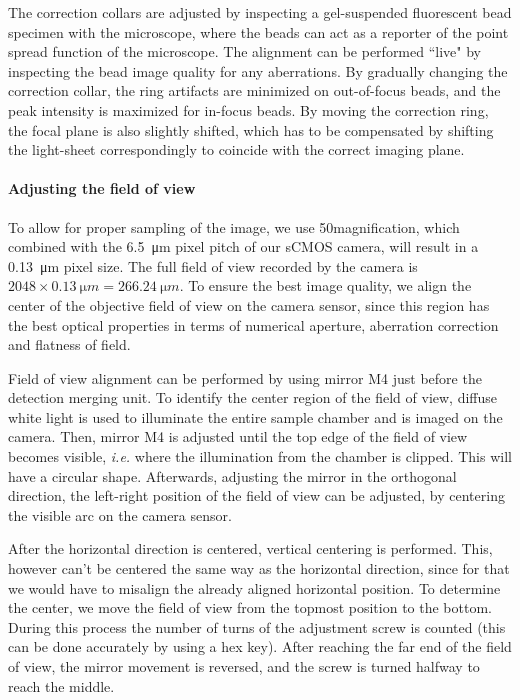       The correction collars are adjusted by inspecting a gel-suspended fluorescent bead specimen with the microscope, where the beads can act as a reporter of the point spread function of the microscope. The alignment can be performed ``live" by inspecting the bead image quality for any aberrations. By gradually changing the correction collar, the ring artifacts are minimized on out-of-focus beads, and the peak intensity is maximized for in-focus beads. By moving the correction ring, the focal plane is also slightly shifted, which has to be compensated by shifting the light-sheet correspondingly to coincide with the correct imaging plane.

    \paragraph{Adjusting the field of view}
      To allow for proper sampling of the image, we use 50\texttimes magnification, which combined with the \SI{6.5}{\micro m} pixel pitch of our sCMOS camera, will result in a \SI{0.13}{\micro m} pixel size. The full field of view recorded by the camera is $2048 \times \SI{0.13}{\micro m} = \SI{266.24}{\micro m}$.
      To ensure the best image quality, we align the center of the objective field of view on the camera sensor, since this region has the best optical properties in terms of numerical aperture, aberration correction and flatness of field.

      Field of view alignment can be performed by using mirror M4 just before the detection merging unit. To identify the center region of the field of view, diffuse white light is used to illuminate the entire sample chamber and is imaged on the camera. Then, mirror M4 is adjusted until the top edge of the field of view becomes visible, \textit{i.e.} where the illumination from the chamber is clipped. This will have a circular shape. Afterwards, adjusting the mirror in the orthogonal direction, the left-right position of the field of view can be adjusted, by centering the visible arc on the camera sensor.

      After the horizontal direction is centered, vertical centering is performed. This, however can't be centered the same way as the horizontal direction, since for that we would have to misalign the already aligned horizontal position. To determine the center, we move the field of view from the topmost position to the bottom. During this process the number of  turns of the adjustment screw is counted (this can be done accurately by using a hex key). After reaching the far end of the field of view, the mirror movement is reversed, and the screw is turned halfway to reach the middle.







